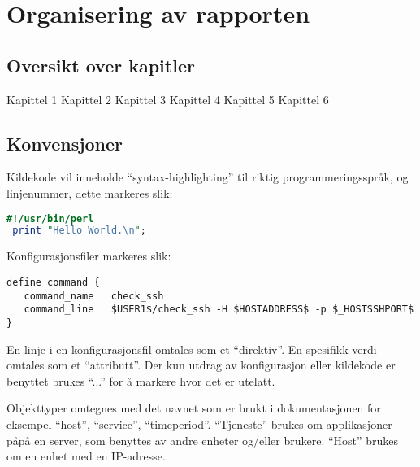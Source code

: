 \section{Organisering av rapporten}
		\subsection{Oversikt over kapitler}
Kapittel 1
Kapittel 2
Kapittel 3
Kapittel 4
Kapittel 5
Kapittel 6
\subsection{Konvensjoner} %

Kildekode vil inneholde ``syntax-highlighting'' til riktig programmeringsspråk, og linjenummer, dette markeres slik:
\begin{lstlisting}[language=perl]
 #!/usr/bin/perl
 print "Hello World.\n";
\end{lstlisting}

Konfigurasjonsfiler markeres slik:
\begin{lstlisting}[style=example]
define command {
   command_name   check_ssh
   command_line   $USER1$/check_ssh -H $HOSTADDRESS$ -p $_HOSTSSHPORT$
}
\end{lstlisting}
En linje i en konfigurasjonsfil omtales som et ``direktiv''. En spesifikk verdi omtales som et ``attributt''.
Der kun utdrag av konfigurasjon eller kildekode er benyttet brukes ``...'' for å markere hvor det er utelatt.

Objekttyper omtegnes med det navnet som er brukt i dokumentasjonen for eksempel ``host'', ``service'', ``timeperiod''. ``Tjeneste'' brukes om applikasjoner påpå en server, som benyttes av andre enheter og/eller brukere. ``Host'' brukes om en enhet med en IP-adresse. 
